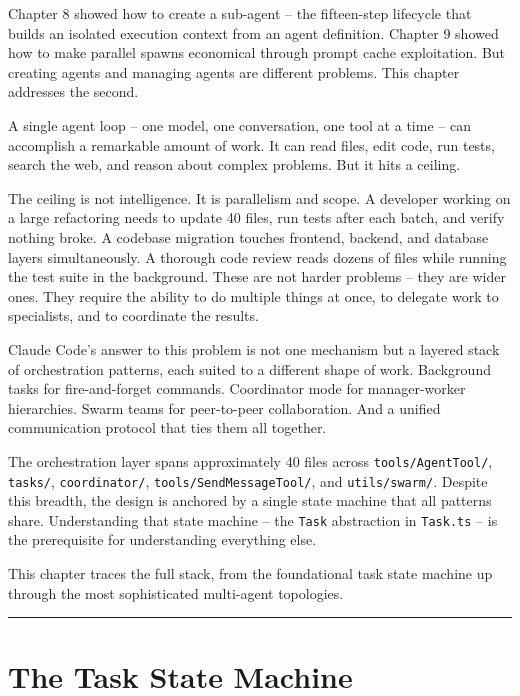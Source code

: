 \documentclass[
  english,
  11pt,
  letterpaper,
]{book}
\begin{document}
Chapter 8 showed how to create a sub-agent -- the fifteen-step lifecycle
that builds an isolated execution context from an agent definition.
Chapter 9 showed how to make parallel spawns economical through prompt
cache exploitation. But creating agents and managing agents are
different problems. This chapter addresses the second.

A single agent loop -- one model, one conversation, one tool at a time
-- can accomplish a remarkable amount of work. It can read files, edit
code, run tests, search the web, and reason about complex problems. But
it hits a ceiling.

The ceiling is not intelligence. It is parallelism and scope. A
developer working on a large refactoring needs to update 40 files, run
tests after each batch, and verify nothing broke. A codebase migration
touches frontend, backend, and database layers simultaneously. A
thorough code review reads dozens of files while running the test suite
in the background. These are not harder problems -- they are wider ones.
They require the ability to do multiple things at once, to delegate work
to specialists, and to coordinate the results.

Claude Code's answer to this problem is not one mechanism but a layered
stack of orchestration patterns, each suited to a different shape of
work. Background tasks for fire-and-forget commands. Coordinator mode
for manager-worker hierarchies. Swarm teams for peer-to-peer
collaboration. And a unified communication protocol that ties them all
together.

The orchestration layer spans approximately 40 files across
\texttt{tools/AgentTool/}, \texttt{tasks/}, \texttt{coordinator/},
\texttt{tools/SendMessageTool/}, and \texttt{utils/swarm/}. Despite this
breadth, the design is anchored by a single state machine that all
patterns share. Understanding that state machine -- the \texttt{Task}
abstraction in \texttt{Task.ts} -- is the prerequisite for understanding
everything else.

This chapter traces the full stack, from the foundational task state
machine up through the most sophisticated multi-agent topologies.

\begin{center}\rule{0.5\linewidth}{0.5pt}\end{center}

\section{The Task State Machine}\label{the-task-state-machine}
\end{document}
